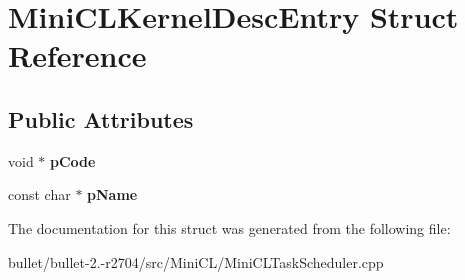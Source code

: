 \hypertarget{struct_mini_c_l_kernel_desc_entry}{\section{Mini\+C\+L\+Kernel\+Desc\+Entry Struct Reference}
\label{struct_mini_c_l_kernel_desc_entry}
}
\subsection*{Public Attributes}
\begin{DoxyCompactItemize}
\item 
\hypertarget{struct_mini_c_l_kernel_desc_entry_af781b97e5a99cdd1e46ec2af45b84e8d}{void $\ast$ {\bfseries p\+Code}}\label{struct_mini_c_l_kernel_desc_entry_af781b97e5a99cdd1e46ec2af45b84e8d}

\item 
\hypertarget{struct_mini_c_l_kernel_desc_entry_ac02eb5ee072b9d0467a5eac66b5e468e}{const char $\ast$ {\bfseries p\+Name}}\label{struct_mini_c_l_kernel_desc_entry_ac02eb5ee072b9d0467a5eac66b5e468e}

\end{DoxyCompactItemize}


The documentation for this struct was generated from the following file\+:\begin{DoxyCompactItemize}
\item 
bullet/bullet-\/2.-\/r2704/src/\+Mini\+C\+L/Mini\+C\+L\+Task\+Scheduler.\+cpp\end{DoxyCompactItemize}
